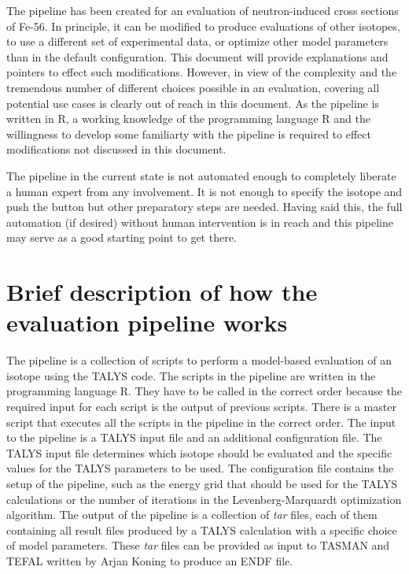\documentclass[12pt,a4paper]{scrartcl}
\begin{document}
 The pipeline has been created for an evaluation of neutron-induced cross sections of Fe-56.
 In principle, it can be modified to produce evaluations of other isotopes, to use a different set of experimental data, or optimize other model parameters than in the default configuration.
 This document will provide explanations and pointers to effect such modifications.
 However, in view of the complexity and the tremendous number of different choices possible in an evaluation, covering all potential use cases is clearly out of reach in this document.
 As the pipeline is written in R, a working knowledge of the programming language R and the willingness to develop some familiarty with the pipeline is required to effect modifications not discussed in this document.
 
 The pipeline in the current state is not automated enough to completely liberate a human expert from any involvement.
 It is not enough to specify the isotope and push the button but other preparatory steps are needed.
 Having said this, the full automation (if desired) without human intervention is in reach and this pipeline may serve as a good starting point to get there.
  
 \section{Brief description of how the evaluation pipeline works}
 The pipeline is a collection of scripts to perform a model-based evaluation of an isotope using the TALYS code.
 The scripts in the pipeline are written in the programming language R.
 They have to be called in the correct order because the required input for each script is the output of previous scripts.
 There is a master script that executes all the scripts in the pipeline in the correct order.
 The input to the pipeline is a TALYS input file and an additional configuration file.
 The TALYS input file determines which isotope should be evaluated and the specific values for the TALYS parameters to be used.
 The configuration file contains the setup of the pipeline, such as the energy grid that should be used for the TALYS calculations or the number of iterations in the Levenberg-Marquardt optimization algorithm.
 The output of the pipeline is a collection of \textit{tar} files, each of them containing all result files produced by a TALYS calculation with a specific choice of model parameters.
 These \textit{tar} files can be provided as input to TASMAN and TEFAL written by Arjan Koning to produce an ENDF file.
 
\end{document}
